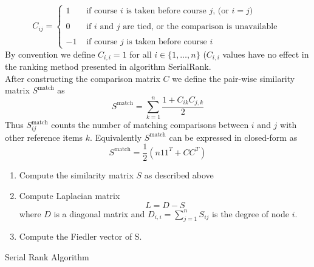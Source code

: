 \documentclass[10pt]{siamltex}
\newcounter{ale}
\begin{document}
\begin{pagewiselinenumbers}
\begin{equation}
C_{ij} = \left\{
	\begin{array}{rl}
 1 & \text{ if course $i$ is taken before course $j$, (or $i=j$)} 	\\
 &  \\
 0 & \text{ if $i$ and $j$ are tied, or the comparison is unavailable }	\\
 &  \\
 -1 & \text{ if course $j$ is taken before course $i$} 
     \end{array}
   \right.
\label{comparisonMatrix1}
\end{equation}
By convention we define $C_{i,i} = 1$ for all $i \in \{1, \dots, n\}$ ($C_{i,i}$ values have no effect in the
ranking method presented in algorithm SerialRank.\\
After constructing the comparison matrix $C$ we define the pair-wise similarity matrix $S^{\text{match}}$ as $$S^{\text{match}} = \sum_{k = 1}^{n} \frac{1+C_{ik}C_{j, k}}{2}$$
Thus $S^{\text{match}}_{ij}$ counts the number of matching comparisons between $i$ and $j$ with other reference
items $k$. Equivalently $S^{\text{match}}$ can be expressed in closed-form as $$S^{\text{match}} = \frac{1}{2}(n11^T + CC^T)$$
\begin{algorithm}[H]
\begin{enumerate}
\item Compute the similarity matrix $S$ as described above
\item Compute Laplacian matrix $$L = D - S$$ where $D$ is a diagonal matrix and $D_{i, i} = \sum_{j = 1}^{n}S_{ij}$ is the degree of node $i$.
\item Compute the Fiedler vector of S.
\end{enumerate}
 \caption{Serial Rank Algorithm}
\end{algorithm}


\end{pagewiselinenumbers}
\end{document}
